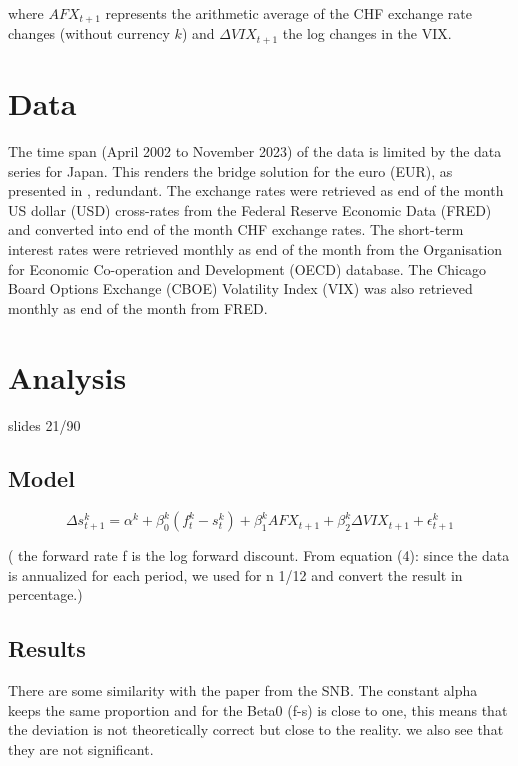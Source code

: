 \documentclass[a4paper,11pt,oneside]{article}
\begin{document}
where $AFX_{t+1}$ represents the arithmetic average of the CHF exchange rate changes (without currency $k$) and $\Delta VIX_{t+1}$ the log changes in the VIX.\par




\section{Data}\label{Data}
The time span (April 2002 to November 2023) of the data is limited by the data series for Japan. This renders the bridge solution for the euro (EUR), as presented in \cite{Grisse and Nitschka 2015}, redundant. The exchange rates were retrieved as end of the month US dollar (USD) cross-rates from the Federal Reserve Economic Data (FRED) and converted into end of the month CHF exchange rates. The short-term interest rates were retrieved monthly as end of the month from the Organisation for Economic Co-operation and Development (OECD) database. The Chicago Board Options Exchange (CBOE) Volatility Index (VIX) was also retrieved monthly as end of the month from FRED.\par
 


\section{Analysis}\label{Analysis}
slides 21/90

\subsection{Model}\label{Model}
\begin{equation}\label{5}
\Delta s_{t+1}^k=\alpha^k+\beta_{0}^k(f_{t}^k-s_{t}^k)+\beta_{1}^k AFX_{t+1}+\beta_{2}^k\Delta VIX_{t+1}+\epsilon_{t+1}^k
\end{equation}

( the forward rate f is the log forward discount. From equation (4): since the data is annualized for each period, we used for n 1/12 and convert the result in percentage.)


\subsection{Results}\label{Results}
There are some similarity with the paper from the SNB.
The constant alpha keeps the same proportion and for the Beta0 (f-s) is close to one, this means that the deviation is not theoretically correct but close to the reality. we also see that they are not significant. 
\end{document}
